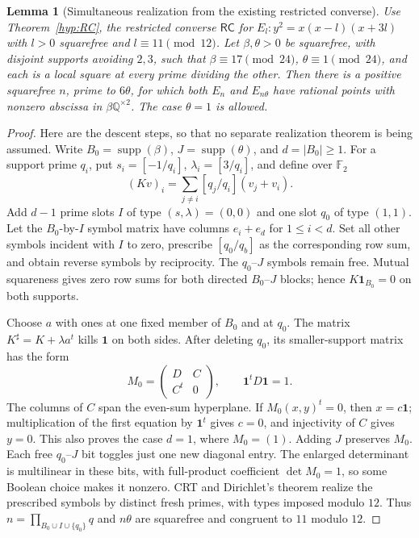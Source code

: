 \documentclass[11pt]{article}
\newtheorem{lemma}[theorem]{Lemma}
\theoremstyle{definition}
\theoremstyle{remark}
\begin{document}
\begin{lemma}[Simultaneous realization from the existing restricted converse]
\label{lem:original-seven-simultaneous-realization}
Use Theorem~\ref{hyp:RC}, the restricted converse $\mathsf{RC}$ for
$E_l:y^2=x(x-l)(x+3l)$ with $l>0$ squarefree and $l\equiv11\pmod{12}$.
Let $\beta,\theta>0$ be squarefree, with disjoint supports avoiding
$2,3$, such that $\beta\equiv17\pmod{24}$,
$\theta\equiv1\pmod{24}$, and each is a local square at every prime
dividing the other. Then there is a positive squarefree $n$, prime
to $6\theta$, for which both $E_n$ and $E_{n\theta}$ have rational
points with nonzero abscissa in $\beta\mathbb Q^{\times2}$.
The case $\theta=1$ is allowed.
\end{lemma}
\begin{proof}
Here are the descent steps, so that no separate realization theorem
is being assumed. Write $B_0=\operatorname{supp}(\beta)$,
$J=\operatorname{supp}(\theta)$, and $d=|B_0|\ge1$.
For a support prime $q_i$, put $s_i=[-1/q_i]$, $\lambda_i=[3/q_i]$,
and define over $\mathbb F_2$
\[
 (Kv)_i=\sum_{j\ne i}[q_j/q_i](v_j+v_i).
\]
Add $d-1$ prime slots $I$ of type $(s,\lambda)=(0,0)$ and one slot
$q_0$ of type $(1,1)$. Let the $B_0$-by-$I$ symbol matrix have columns
$e_i+e_d$ for $1\le i<d$. Set all other symbols incident with $I$
to zero, prescribe $[q_0/q_b]$ as the corresponding row sum, and
obtain reverse symbols by reciprocity. The $q_0$--$J$ symbols remain
free. Mutual squareness gives zero row sums for both directed
$B_0$--$J$ blocks; hence $K\mathbf1_{B_0}=0$ on both supports.

Choose $a$ with ones at one fixed member of $B_0$ and at $q_0$.
The matrix $K^\sharp=K+\lambda a^t$ kills $\mathbf1$ on both sides.
After deleting $q_0$, its smaller-support matrix has the form
\[
 M_0=\begin{pmatrix}D&C\\C^t&0\end{pmatrix},
 \qquad \mathbf1^tD\mathbf1=1.
\]
The columns of $C$ span the even-sum hyperplane. If $M_0(x,y)^t=0$,
then $x=c\mathbf1$; multiplication of the first equation by
$\mathbf1^t$ gives $c=0$, and injectivity of $C$ gives $y=0$.
This also proves the case $d=1$, where $M_0=(1)$.
Adding $J$ preserves $M_0$. Each free $q_0$--$J$ bit toggles just
one new diagonal entry. The enlarged determinant is multilinear in
these bits, with full-product coefficient $\det M_0=1$, so some
Boolean choice makes it nonzero. CRT and Dirichlet's theorem realize
the prescribed symbols by distinct fresh primes, with types imposed
modulo $12$. Thus $n=\prod_{B_0\cup I\cup\{q_0\}}q$ and $n\theta$
are squarefree and congruent to $11$ modulo $12$.


\end{proof}
\end{document}

